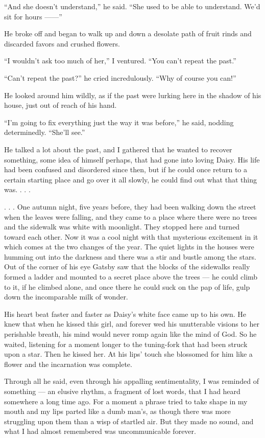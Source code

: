 \documentclass{znotebook}
\begin{document}
``And she doesn’t understand,'' he said. ``She used to be able to understand. We’d sit for hours ——''

He broke off and began to walk up and down a desolate path of fruit rinds and discarded favors and crushed flowers.

``I wouldn’t ask too much of her,'' I ventured. ``You can’t repeat the past.''

``Can’t repeat the past?'' he cried incredulously. ``Why of course you can!''

He looked around him wildly, as if the past were lurking here in the shadow of his house, just out of reach of his hand.

``I’m going to fix everything just the way it was before,'' he said, nodding determinedly. ``She’ll see.''

He talked a lot about the past, and I gathered that he wanted to recover something, some idea of himself perhaps, that had gone into loving Daisy. His life had been confused and disordered since then, but if he could once return to a certain starting place and go over it all slowly, he could find out what that thing was. . . .

. . . One autumn night, five years before, they had been walking down the street when the leaves were falling, and they came to a place where there were no trees and the sidewalk was white with moonlight. They stopped here and turned toward each other. Now it was a cool night with that mysterious excitement in it which comes at the two changes of the year. The quiet lights in the houses were humming out into the darkness and there was a stir and bustle among the stars. Out of the corner of his eye Gatsby saw that the blocks of the sidewalks really formed a ladder and mounted to a secret place above the trees — he could climb to it, if he climbed alone, and once there he could suck on the pap of life, gulp down the incomparable milk of wonder.

His heart beat faster and faster as Daisy’s white face came up to his own. He knew that when he kissed this girl, and forever wed his unutterable visions to her perishable breath, his mind would never romp again like the mind of God. So he waited, listening for a moment longer to the tuning-fork that had been struck upon a star. Then he kissed her. At his lips’ touch she blossomed for him like a flower and the incarnation was complete.

Through all he said, even through his appalling sentimentality, I was reminded of something — an elusive rhythm, a fragment of lost words, that I had heard somewhere a long time ago. For a moment a phrase tried to take shape in my mouth and my lips parted like a dumb man’s, as though there was more struggling upon them than a wisp of startled air. But they made no sound, and what I had almost remembered was uncommunicable forever.
\end{document}
